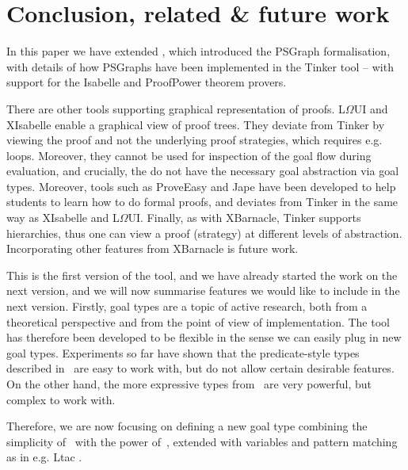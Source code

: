 \documentclass[submission,copyright,creativecommons]{eptcs}
\begin{document}
\vspace{-15pt}
\section{Conclusion, related \& future work}
\vspace{-10pt}

In this paper we have extended \cite{LPAR13}, which introduced the PSGraph formalisation, with details of how PSGraphs have been implemented in the Tinker tool -- with support for the Isabelle and ProofPower theorem provers. 

There are other tools supporting graphical representation of proofs. L$\Omega$UI \cite{SiekmannHBCFHKKMMPS99} and XIsabelle \cite{Ozols97} enable a graphical view of proof trees. They deviate from Tinker by viewing the proof and not the underlying proof strategies, which requires e.g. loops. Moreover, they cannot be used for inspection of the goal flow during evaluation, and crucially, the do not have the necessary goal abstraction via goal types. Moreover, tools such as ProveEasy \cite{Burstall2000} and
Jape \cite{bornat1997jape} have been developed to help students to learn how to do formal proofs, and deviates from Tinker in the same way as XIsabelle and L$\Omega$UI. Finally, as with XBarnacle\cite{Lowe97xbarnacle},  Tinker supports hierarchies, thus one can view a proof (strategy) at different levels of abstraction. Incorporating other features from XBarnacle is future work.

This is the first version of the tool, and we have already started the work on the next version, and we will now summarise features we would like to include in the next version. Firstly, goal types are a topic of active research, both from a theoretical perspective and from the point of view of implementation. The tool has therefore been developed to be flexible in the sense we can easily plug in new goal types. Experiments so far have shown that the predicate-style types described in~\cite{LPAR13} are easy to work with, but do not allow certain desirable features. On the other hand, the more expressive types from~\cite{grov13a} are very powerful, but complex to work with.

Therefore, we are now focusing on defining a new goal type combining the simplicity of~\cite{LPAR13} with the power of~\cite{grov13a}, extended with variables and pattern matching as in e.g. {\cal L}tac \cite{Delahaye02}.
\end{document}
